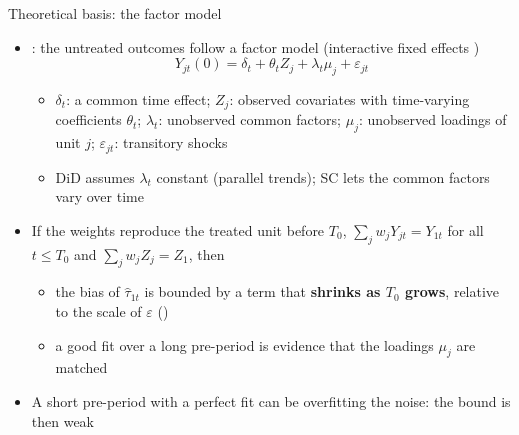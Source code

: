 \begin{frame}{Theoretical basis: the factor model}
\itemsize{\small}
\begin{itemize}
    \item {}: the untreated outcomes follow a factor model (interactive fixed effects ) \[ Y_{jt}(0) = \delta_t + \theta_tZ_j + \lambda_t\mu_j + \varepsilon_{jt} \]
    \begin{itemize}
        \item $\delta_t$: a common time effect; $Z_j$: observed covariates with time-varying coefficients $\theta_t$; $\lambda_t$: unobserved common factors; $\mu_j$: unobserved loadings of unit $j$; $\varepsilon_{jt}$: transitory shocks
        \item DiD assumes $\lambda_t$ constant (parallel trends); SC lets the common factors vary over time
    \end{itemize}
    \item If the weights reproduce the treated unit before $T_0$, $\sum_j w_jY_{jt} = Y_{1t}$ for all $t \le T_0$ and $\sum_j w_jZ_j = Z_1$, then
    \begin{itemize}
        \item the bias of $\hat\tau_{1t}$ is bounded by a term that \textbf{shrinks as $T_0$ grows}, relative to the scale of $\varepsilon$ ()
        \item a good fit over a long pre-period is evidence that the loadings $\mu_j$ are matched
    \end{itemize}
    \item A short pre-period with a perfect fit can be overfitting the noise: the bound is then weak 
\end{itemize}
\end{frame}

